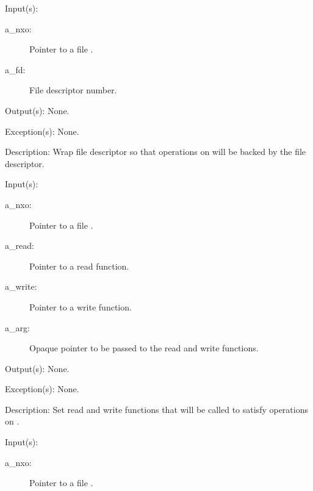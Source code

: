 \begin{capi}
\begin{capilist}
	\item[Input(s): ]
		\begin{description}\item[]
		\item[a\_nxo: ]
			Pointer to a file .
		\item[a\_fd: ]
			File descriptor number.
		\end{description}
	\item[Output(s): ] None.
	\item[Exception(s): ] None.
	\item[Description: ]
		Wrap file descriptor  so that operations on
		 will be backed by the file descriptor.
	\end{capilist}
\label{nxo_file_interactive}
	\begin{capilist}
	\item[Input(s): ]
		\begin{description}\item[]
		\item[a\_nxo: ]
			Pointer to a file .
		\item[a\_read: ]
			Pointer to a read function.
		\item[a\_write: ]
			Pointer to a write function.
		\item[a\_arg: ]
			Opaque pointer to be passed to the read and write
			functions.
		\end{description}
	\item[Output(s): ] None.
	\item[Exception(s): ] None.
	\item[Description: ]
		Set read and write functions that will be called to satisfy
		operations on .
	\end{capilist}
\label{nxo_file_open}
	\begin{capilist}
	\item[Input(s): ]
		\begin{description}\item[]
		\item[a\_nxo: ]
			Pointer to a file \classname{nxo}.

\end{description}
\end{capilist}
\end{capi}
